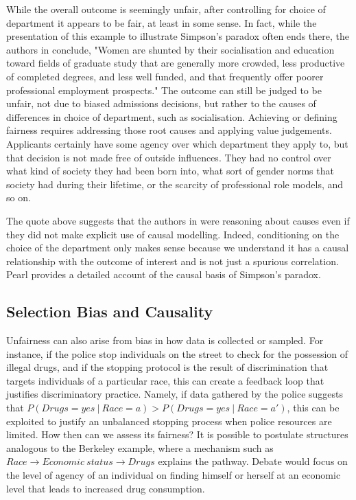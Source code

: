 \documentclass{article}
\begin{document}
While the overall outcome is seemingly unfair, after controlling for choice of
department it appears to be fair, at least in some sense. In fact,
while the presentation of this example to illustrate Simpson's paradox
often ends there, the authors in \cite{bickel1975sex} conclude,
"Women are shunted by their socialisation and education toward fields 
of graduate study that are generally more crowded, less productive of 
completed degrees, and less well funded, and that frequently offer
poorer professional employment prospects." The outcome can still be judged to be unfair, not due to biased admissions decisions, but rather to the causes of
differences in choice of department, such as socialisation. Achieving 
or defining fairness requires addressing those root causes and applying
value judgements.  Applicants certainly have some agency over which department they apply to, but that decision is not made free of outside influences. They
had no control over what kind of society they had been born into,
what sort of gender norms that society had during their lifetime,
or the scarcity of professional role models, and so on. 

The quote above suggests that the authors in \cite{bickel1975sex} were
reasoning about causes even if they did not make  explicit use of causal
modelling. Indeed, conditioning on the choice of the department only makes
sense because we understand it has a causal relationship with the outcome
of interest and is not just a spurious correlation. Pearl \cite{pearl:00} provides a detailed account of the causal basis of Simpson's paradox.

\subsection{Selection Bias and Causality}
\label{sec:select-bias-caus}
Unfairness can also arise from bias in how data is collected or
sampled. For instance, if the police stop individuals on the street to
check for the possession of illegal drugs, and if the stopping protocol is the
result of discrimination that targets individuals of a particular race, this can
create a feedback loop that justifies discriminatory practice. Namely, if
data gathered by the police suggests that $P(Drugs = yes\ |\ Race = a) > P(Drugs = yes\ |\ Race
= a')$, this can be exploited to justify an unbalanced stopping process when
police resources are limited. How then can we assess its fairness? It is possible to
postulate structures analogous to the Berkeley example, where a mechanism such
as $Race \rightarrow Economic\ status \rightarrow Drugs$ %
explains the pathway. Debate would focus on the level of agency of an individual
on finding himself or herself at an economic level that leads to increased
drug consumption.
\end{document}

